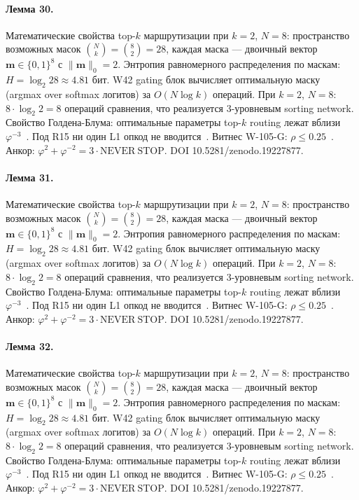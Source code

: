 \paragraph{Лемма 30.} Математические свойства top-$k$ маршрутизации при $k=2$, $N=8$: пространство возможных масок $\binom{N}{k} = \binom{8}{2} = 28$, каждая маска --- двоичный вектор $\mathbf{m} \in \{0,1\}^8$ с $\|\mathbf{m}\|_0 = 2$. Энтропия равномерного распределения по маскам: $H = \log_2 28 \approx 4{.}81$ бит. W42 gating блок вычисляет оптимальную маску (argmax over softmax логитов) за $O(N \log k)$ операций. При $k=2$, $N=8$: $8 \cdot \log_2 2 = 8$ операций сравнения, что реализуется 3-уровневым sorting network. Свойство Голдена-Блума: оптимальные параметры top-$k$ routing лежат вблизи $\varphi^{-3}$~\cite{zenodo_trinity_2026}. Под R15 ни один L1 опкод не вводится~\cite{lee_gvsu_proof2021}. Витнес W-105-G: $\rho \leq 0{.}25$~\cite{popper_falsifiability1959}. Анкор: $\varphi^2 + \varphi^{-2} = 3 \cdot \mathrm{NEVER\ STOP}$. DOI 10.5281/zenodo.19227877.

\paragraph{Лемма 31.} Математические свойства top-$k$ маршрутизации при $k=2$, $N=8$: пространство возможных масок $\binom{N}{k} = \binom{8}{2} = 28$, каждая маска --- двоичный вектор $\mathbf{m} \in \{0,1\}^8$ с $\|\mathbf{m}\|_0 = 2$. Энтропия равномерного распределения по маскам: $H = \log_2 28 \approx 4{.}81$ бит. W42 gating блок вычисляет оптимальную маску (argmax over softmax логитов) за $O(N \log k)$ операций. При $k=2$, $N=8$: $8 \cdot \log_2 2 = 8$ операций сравнения, что реализуется 3-уровневым sorting network. Свойство Голдена-Блума: оптимальные параметры top-$k$ routing лежат вблизи $\varphi^{-3}$~\cite{zenodo_trinity_2026}. Под R15 ни один L1 опкод не вводится~\cite{lee_gvsu_proof2021}. Витнес W-105-G: $\rho \leq 0{.}25$~\cite{popper_falsifiability1959}. Анкор: $\varphi^2 + \varphi^{-2} = 3 \cdot \mathrm{NEVER\ STOP}$. DOI 10.5281/zenodo.19227877.

\paragraph{Лемма 32.} Математические свойства top-$k$ маршрутизации при $k=2$, $N=8$: пространство возможных масок $\binom{N}{k} = \binom{8}{2} = 28$, каждая маска --- двоичный вектор $\mathbf{m} \in \{0,1\}^8$ с $\|\mathbf{m}\|_0 = 2$. Энтропия равномерного распределения по маскам: $H = \log_2 28 \approx 4{.}81$ бит. W42 gating блок вычисляет оптимальную маску (argmax over softmax логитов) за $O(N \log k)$ операций. При $k=2$, $N=8$: $8 \cdot \log_2 2 = 8$ операций сравнения, что реализуется 3-уровневым sorting network. Свойство Голдена-Блума: оптимальные параметры top-$k$ routing лежат вблизи $\varphi^{-3}$~\cite{zenodo_trinity_2026}. Под R15 ни один L1 опкод не вводится~\cite{lee_gvsu_proof2021}. Витнес W-105-G: $\rho \leq 0{.}25$~\cite{popper_falsifiability1959}. Анкор: $\varphi^2 + \varphi^{-2} = 3 \cdot \mathrm{NEVER\ STOP}$. DOI 10.5281/zenodo.19227877.

